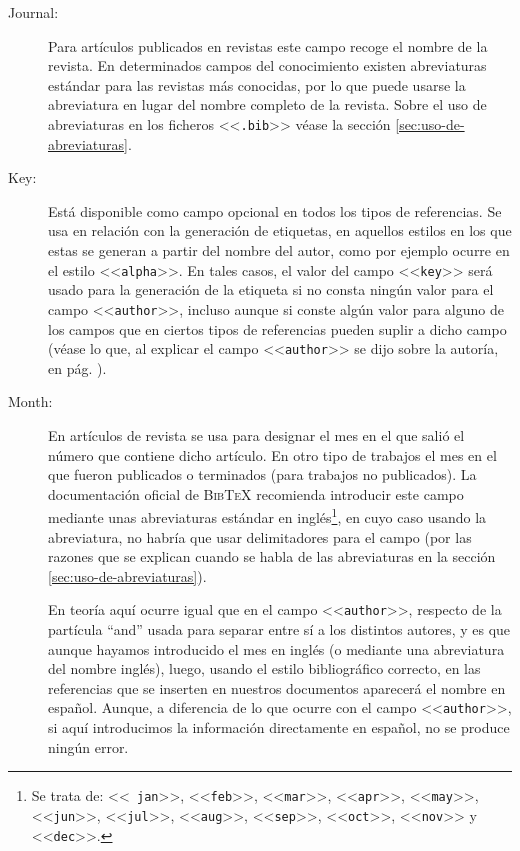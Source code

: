 \documentclass[a4paper,11pt]{article}
\def\btx-{\textsc{Bib\TeX}}
\def\ltr#1-{<<\texttt{#1}>>}
\def\tpf#1-{\ltr.#1-}
\begin{document}
\begin{description}
\item[Journal:]  Para artículos publicados  en revistas  este campo  recoge el
  nombre  de la  revista.   En determinados  campos  del conocimiento  existen
  abreviaturas  estándar para  las revistas  más conocidas,  por lo  que puede
  usarse la abreviatura  en lugar del nombre completo de  la revista. Sobre el
  uso  de   abreviaturas  en   los  ficheros  \tpf   bib-  véase   la  sección
  \ref{sec:uso-de-abreviaturas}.

\item[Key:]  Está  disponible  como  campo  opcional en  todos  los  tipos  de
  referencias.  Se usa en relación con la generación de etiquetas, en aquellos
  estilos en los que estas se generan  a partir del nombre del autor, como por
  ejemplo ocurre en el estilo \ltr  alpha-. En tales casos, el valor del campo
  \ltr key- será  usado para la generación de la etiqueta  si no consta ningún
  valor para el campo \ltr author-,  incluso aunque si conste algún valor para
  alguno de  los campos que  en ciertos tipos  de referencias pueden  suplir a
  dicho campo (véase  lo que, al explicar el campo \ltr  author- se dijo sobre
  la autoría, en pág.  \pageref{sec:la-autoria-de}).

\item[Month:] En  artículos de revista se usa  para designar el mes  en el que
  salió el número que contiene dicho artículo. En otro tipo de trabajos el mes
  en el que  fueron publicados o terminados (para  trabajos no publicados). La
  documentación  oficial de  \btx- recomienda  introducir este  campo mediante
  unas abreviaturas estándar en inglés\footnote{\label{meses}Se trata de: \ltr
    jan-, \ltr  feb-, \ltr mar-, \ltr  apr-, \ltr may-, \ltr  jun-, \ltr jul-,
    \ltr aug-,  \ltr sep-, \ltr  oct-, \ltr nov-  y \ltr dec-.}, en  cuyo caso
  usando la abreviatura,  no habría que usar delimitadores  para el campo (por
  las  razones que  se explican  cuando  se habla  de las  abreviaturas en  la
  sección \ref{sec:uso-de-abreviaturas}).

  En teoría  aquí ocurre igual  que en el  campo \ltr author-, respecto  de la
  partícula ``and'' usada para separar entre  sí a los distintos autores, y es
  que aunque hayamos introducido el  mes en inglés (o mediante una abreviatura
  del nombre inglés),  luego, usando el estilo bibliográfico  correcto, en las
  referencias que  se inserten en  nuestros documentos aparecerá el  nombre en
  español.  Aunque, a  diferencia de lo que ocurre con  el campo \ltr author-,
  si aquí introducimos  la información directamente en español,  no se produce
  ningún error.


\end{description}
\end{document}
